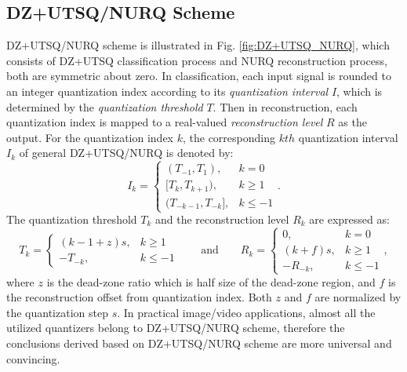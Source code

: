 \documentclass[smallabstract,smallcaptions]{dccpaper}
\begin{document}

\subsection{DZ+UTSQ/NURQ Scheme}
DZ+UTSQ/NURQ scheme is illustrated in Fig. \ref{fig:DZ+UTSQ_NURQ}, which consists of DZ+UTSQ classification process and NURQ reconstruction process, both are symmetric about zero. In classification, each input signal is rounded to an integer quantization index according to its \emph{quantization interval} $I$, which is determined by the \emph{quantization threshold} $T$. Then in reconstruction, each quantization index is mapped to a real-valued \emph{reconstruction level} $R$ as the output. For the quantization index $k$, the corresponding $kth$ quantization interval $I_{k}$ of general DZ+UTSQ/NURQ is denoted by:
\begin{equation}
\label{equ:interval}
I_{k}=\left\{ \begin{array}{ll}
(T_{-1}, T_{1}),         & k = 0 \\
{[T_{k}, T_{k+1})},        & k \ge 1 \\
(T_{-k-1}, T_{-k}],      & k \le -1
\end{array}\right. .
\end{equation}
The quantization threshold $T_{k}$ and the reconstruction level $R_{k}$ are expressed as:
\begin{equation}
\label{equ:DZ+UTSQ/NURQ}
T_{k}=\left\{ \begin{array}{ll}
(k-1+z)s, & k \ge 1 \\
-T_{-k},  & k \le -1
\end{array}\right.
\qquad \textrm{and} \qquad
R_{k}=\left\{ \begin{array}{ll}
0,        & k = 0 \\
(k+f)s,   & k \ge 1 \\
-R_{-k},  & k \le -1
\end{array}\right. ,
\end{equation}
where $z$ is the dead-zone ratio which is half size of the dead-zone region, and $f$ is the reconstruction offset from quantization index. Both $z$ and $f$ are normalized by the quantization step $s$. In practical image/video applications, almost all the utilized quantizers belong to DZ+UTSQ/NURQ scheme, therefore the conclusions derived based on DZ+UTSQ/NURQ scheme are more universal and convincing.
\end{document}
